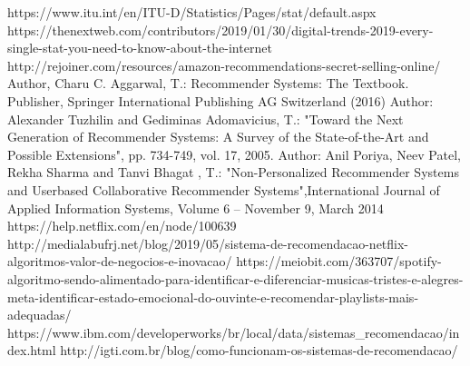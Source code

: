 \documentclass[runningheads]{llncs}
\begin{document}


\newpage
\hfill








%
%
%
% 
% 
%
\begin{thebibliography}{8}

https://www.itu.int/en/ITU-D/Statistics/Pages/stat/default.aspx
https://thenextweb.com/contributors/2019/01/30/digital-trends-2019-every-single-stat-you-need-to-know-about-the-internet
http://rejoiner.com/resources/amazon-recommendations-secret-selling-online/
Author, Charu C. Aggarwal, T.: Recommender Systems: The Textbook. Publisher, Springer International Publishing AG Switzerland (2016)
Author: Alexander Tuzhilin and Gediminas Adomavicius, T.: "Toward the Next Generation of Recommender Systems: A Survey of the State-of-the-Art and Possible Extensions", pp. 734-749, vol. 17, 2005.
Author: Anil Poriya, Neev Patel, Rekha Sharma and Tanvi Bhagat , T.: "Non-Personalized Recommender Systems and Userbased Collaborative Recommender Systems",International Journal of Applied Information Systems, Volume 6 – November 9, March 2014
 {https://help.netflix.com/en/node/100639}
 {http://medialabufrj.net/blog/2019/05/sistema-de-recomendacao-netflix-algoritmos-valor-de-negocios-e-inovacao/}
 {https://meiobit.com/363707/spotify-algoritmo-sendo-alimentado-para-identificar-e-diferenciar-musicas-tristes-e-alegres-meta-identificar-estado-emocional-do-ouvinte-e-recomendar-playlists-mais-adequadas/
}
 {https://www.ibm.com/developerworks/br/local/data/sistemas\_recomendacao/index.html}
 {http://igti.com.br/blog/como-funcionam-os-sistemas-de-recomendacao/}


\end{thebibliography}
\end{document}
